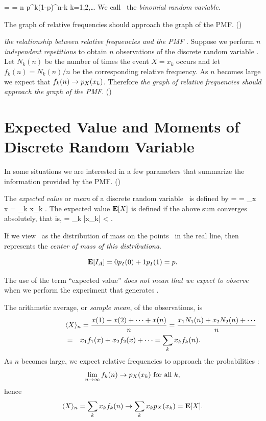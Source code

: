 		 =  = {n } p^k(1-p)^{n-k}
		\mfor k=1,2,\ldots
	\eeql
	We call \X\ the \emph{binomial random variable}.

	\item The graph of relative frequencies should approach the graph of the PMF.
	()

	\item \emph{the relationship between relative frequencies and the PMF }.
	Suppose we perform \emph{$n$ independent repetitions}
	to obtain $n$ observations of the discrete random variable \X.
	Let $N_k(n)$ be the number of times the event
	$X = x_k$ occurs and let
	$f_k(n) = N_k(n)/n$
	be the corresponding relative frequency.
	As $n$ becomes large we expect that $f_k(n) \to p_{X}(x_k)$.
	Therefore \emph{the graph of relative frequencies should approach
	the graph of the PMF}.
	()
\eit

\section{Expected Value and Moments of Discrete Random Variable}
\bit
	\item
	In some situations
	we are interested in a few parameters
	that summarize the information provided by the PMF.
	()

	\item
	The \emph{expected value} or \emph{mean}
	of a discrete random variable \X\ is defined by
		 = 
		= \sum_{x\in\ssx} x 
		= \sum_k x_k .
	\eeql
	The expected value ${\bf E}[X]$ is defined if the above sum converges absolutely,
	that is,
		 = \sum_k |x_k|  < \infty.
	\eeql

	\item If we view \
	as the distribution of mass on the points \ in the real line,
	then \Expect{X} represents the \emph{center of mass of this distributiona}.

	\item {}
	\[
		{\bf E}[I_A] = 0 p_{I}(0) + 1 p_{I}(1) = p.
	\]

	\item
	The use of the term ``expected value''
	\emph{does not mean that we expect to observe }
	when we perform the experiment that generates \X.

	\item The arithmetic average, or \emph{sample mean}, of the observations,
	is
	\begin{eqnarray}
		\lefteqn
		{
			\samplemean{X}{n}
			= \frac{x(1)+x(2)+\cdots+x(n)}{n}
			= \frac{x_1N_1(n) + x_2N_2(n) + \cdots}{n}
		}
		\nonumber
		\\&=& x_1f_1(x) + x_2f_2(x) + \cdots
		= \sum_k x_k f_k(n).
		\label{eq-sample-mean}
	\end{eqnarray}
	As $n$ becomes large,
	we expect relative frequencies to approach the probabilities :
	\[
		\lim_{n\to\infty} f_k(n) \to p_{X}(x_k) \mbox{ for all } k,
	\]
	hence
	\[
		\langle{X}\rangle_{n} = \sum_k x_k f_k(n)
		\to \sum_k x_k p_{X}(x_k) = {\bf E}[X].
	\]


